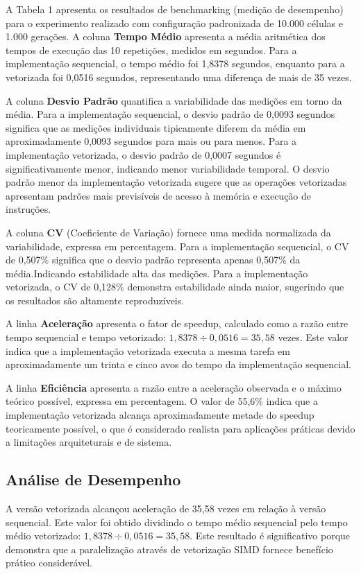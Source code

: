 \documentclass[12pt]{article}
\begin{document}
A Tabela 1 apresenta os resultados de benchmarking (medição de desempenho) para o experimento realizado com configuração padronizada de 10.000 células e 1.000 gerações. A coluna \textbf{Tempo Médio} apresenta a média aritmética dos tempos de execução das 10 repetições, medidos em segundos. Para a implementação sequencial, o tempo médio foi 1,8378 segundos, enquanto para a vetorizada foi 0,0516 segundos, representando uma diferença de mais de 35 vezes.

A coluna \textbf{Desvio Padrão} quantifica a variabilidade das medições em torno da média. Para a implementação sequencial, o desvio padrão de 0,0093 segundos significa que as medições individuais tipicamente diferem da média em aproximadamente 0,0093 segundos para mais ou para menos. Para a implementação vetorizada, o desvio padrão de 0,0007 segundos é significativamente menor, indicando menor variabilidade temporal. O desvio padrão menor da implementação vetorizada sugere que as operações vetorizadas apresentam padrões mais previsíveis de acesso à memória e execução de instruções.

A coluna \textbf{CV} (Coeficiente de Variação) fornece uma medida normalizada da variabilidade, expressa em percentagem. Para a implementação sequencial, o CV de 0,507\% significa que o desvio padrão representa apenas 0,507\% da média.Indicando estabilidade alta das medições. Para a implementação vetorizada, o CV de 0,128\% demonstra estabilidade ainda maior, sugerindo que os resultados são altamente reproduzíveis.

A linha \textbf{Aceleração} apresenta o fator de speedup, calculado como a razão entre tempo sequencial e tempo vetorizado: $1,8378 \div 0,0516 = 35,58$ vezes. Este valor indica que a implementação vetorizada executa a mesma tarefa em aproximadamente um trinta e cinco avos do tempo da implementação sequencial.

A linha \textbf{Eficiência} apresenta a razão entre a aceleração observada e o máximo teórico possível, expressa em percentagem. O valor de 55,6\% indica que a implementação vetorizada alcança aproximadamente metade do speedup teoricamente possível, o que é considerado realista para aplicações práticas devido a limitações arquiteturais e de sistema.

\subsection{Análise de Desempenho}

A versão vetorizada alcançou aceleração de 35,58 vezes em relação à versão sequencial. Este valor foi obtido dividindo o tempo médio sequencial pelo tempo médio vetorizado: $1,8378 \div 0,0516 = 35,58$. Este resultado é significativo porque demonstra que a paralelização através de vetorização SIMD fornece benefício prático considerável.
\end{document}
